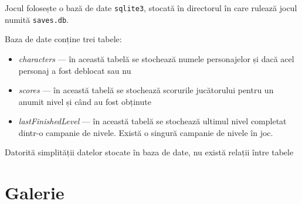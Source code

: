 \documentclass{article}
\begin{document}
    Jocul folosește o bază de date \texttt{sqlite3}, stocată în directorul în care rulează jocul
    numită \texttt{saves.db}.

    Baza de date conține trei tabele:
    \begin{itemize}
        \item \emph{characters} --- în această tabelă se stochează numele personajelor și dacă acel
        personaj a fost deblocat sau nu
        \item \emph{scores} --- în această tabelă se stochează scorurile jucătorului pentru un anumit
        nivel și când au fost obținute
        \item \emph{lastFinishedLevel} --- în această tabelă se stochează ultimul nivel completat
        dintr-o campanie de nivele. Există o singură campanie de nivele în joc.
    \end{itemize}

    Datorită simplității datelor stocate în baza de date, nu există relații între tabele

    \section{Galerie}
\end{document}
